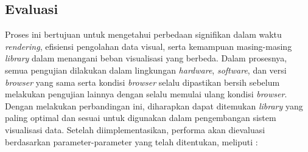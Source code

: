 \subsection{Evaluasi}
Proses ini bertujuan untuk mengetahui perbedaan signifikan dalam waktu \textit{rendering}, efisiensi pengolahan data visual, serta kemampuan masing-masing \textit{library} dalam menangani beban visualisasi yang berbeda. Dalam prosesnya, semua pengujian dilakukan dalam lingkungan \textit{hardware}, \textit{software}, dan versi \textit{browser} yang sama serta kondisi \textit{browser} selalu dipastikan bersih sebelum melakukan pengujian lainnya dengan selalu memulai ulang kondisi \textit{browser}. Dengan melakukan perbandingan ini, diharapkan dapat ditemukan \textit{library} yang paling optimal dan sesuai untuk digunakan dalam pengembangan sistem visualisasi data. Setelah diimplementasikan, performa akan dievaluasi berdasarkan parameter-parameter yang telah ditentukan, meliputi : 
